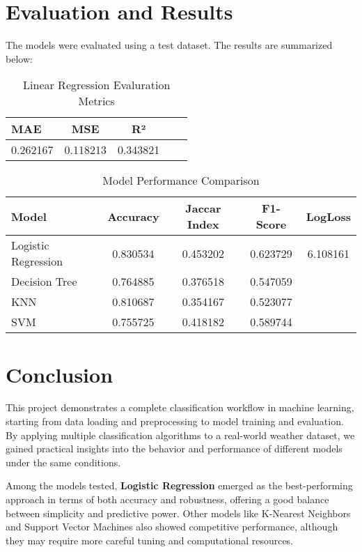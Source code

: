\documentclass[12pt]{article}
\begin{document}
\section{Evaluation and Results}
The models were evaluated using a test dataset. The results are summarized below:

\begin{table}[H]
\centering
\begin{tabular}{lcccc}
\toprule
MAE & MSE & R² \\
\midrule
0.262167 & 0.118213 & 0.343821 \\

\bottomrule
\end{tabular}
\caption{Linear Regression Evaluration Metrics}
\end{table}

\begin{table}[H]
\centering
\begin{tabular}{lcccc}
\toprule
Model & Accuracy & Jaccar Index & F1-Score & LogLoss \\
\midrule
Logistic Regression & 0.830534 & 0.453202 & 0.623729 & 6.108161 \\
Decision Tree       & 0.764885 & 0.376518 & 0.547059 \\
KNN                 & 0.810687 & 0.354167 & 0.523077 \\
SVM                 & 0.755725 & 0.418182 & 0.589744 \\
\bottomrule
\end{tabular}
\caption{Model Performance Comparison}
\end{table}
\newpage

\section{Conclusion}
\hspace*{1cm}This project demonstrates a complete classification workflow in machine learning, starting from data loading and preprocessing to model training and evaluation. By applying multiple classification algorithms to a real-world weather dataset, we gained practical insights into the behavior and performance of different models under the same conditions.

Among the models tested, \textbf{Logistic Regression} emerged as the best-performing approach in terms of both accuracy and robustness, offering a good balance between simplicity and predictive power. Other models like K-Nearest Neighbors and Support Vector Machines also showed competitive performance, although they may require more careful tuning and computational resources.
\end{document}
